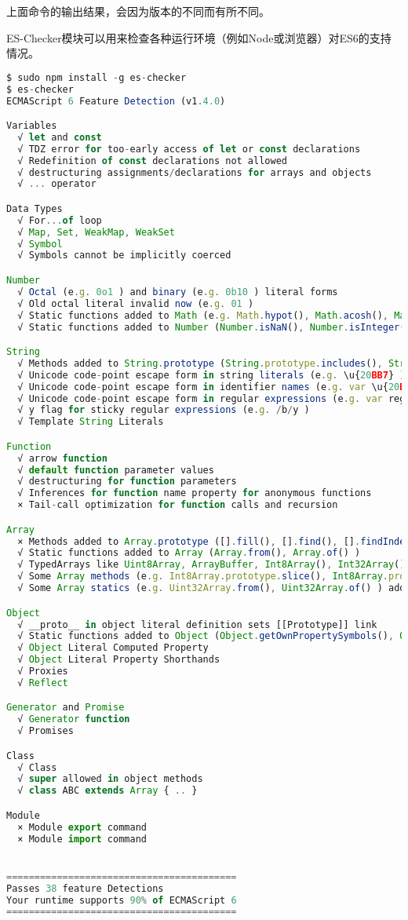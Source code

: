 上面命令的输出结果，会因为版本的不同而有所不同。


ES-Checker模块可以用来检查各种运行环境（例如Node或浏览器）对ES6的支持情况。


\begin{lstlisting}[language=JavaScript]
$ sudo npm install -g es-checker
$ es-checker
ECMAScript 6 Feature Detection (v1.4.0)

Variables
  √ let and const
  √ TDZ error for too-early access of let or const declarations
  √ Redefinition of const declarations not allowed
  √ destructuring assignments/declarations for arrays and objects
  √ ... operator

Data Types
  √ For...of loop
  √ Map, Set, WeakMap, WeakSet
  √ Symbol
  √ Symbols cannot be implicitly coerced

Number
  √ Octal (e.g. 0o1 ) and binary (e.g. 0b10 ) literal forms
  √ Old octal literal invalid now (e.g. 01 )
  √ Static functions added to Math (e.g. Math.hypot(), Math.acosh(), Math.imul() )
  √ Static functions added to Number (Number.isNaN(), Number.isInteger() )

String
  √ Methods added to String.prototype (String.prototype.includes(), String.prototype.repeat() )
  √ Unicode code-point escape form in string literals (e.g. \u{20BB7} )
  √ Unicode code-point escape form in identifier names (e.g. var \u{20BB7} = 42; )
  √ Unicode code-point escape form in regular expressions (e.g. var regexp = /\u{20BB7}/u; )
  √ y flag for sticky regular expressions (e.g. /b/y )
  √ Template String Literals

Function
  √ arrow function
  √ default function parameter values
  √ destructuring for function parameters
  √ Inferences for function name property for anonymous functions
  × Tail-call optimization for function calls and recursion

Array
  × Methods added to Array.prototype ([].fill(), [].find(), [].findIndex(), [].entries(), [].keys(), [].values() )
  √ Static functions added to Array (Array.from(), Array.of() )
  √ TypedArrays like Uint8Array, ArrayBuffer, Int8Array(), Int32Array(), Float64Array()
  √ Some Array methods (e.g. Int8Array.prototype.slice(), Int8Array.prototype.join(), Int8Array.prototype.forEach() ) added to the TypedArray prototypes
  √ Some Array statics (e.g. Uint32Array.from(), Uint32Array.of() ) added to the TypedArray constructors

Object
  √ __proto__ in object literal definition sets [[Prototype]] link
  √ Static functions added to Object (Object.getOwnPropertySymbols(), Object.assign() )
  √ Object Literal Computed Property
  √ Object Literal Property Shorthands
  √ Proxies
  √ Reflect

Generator and Promise
  √ Generator function
  √ Promises

Class
  √ Class
  √ super allowed in object methods
  √ class ABC extends Array { .. }

Module
  × Module export command
  × Module import command


=========================================
Passes 38 feature Detections
Your runtime supports 90% of ECMAScript 6
=========================================
\end{lstlisting}


